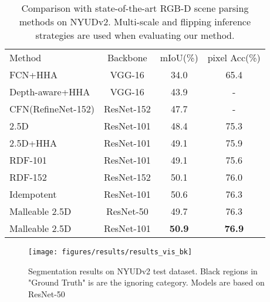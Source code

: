 \documentclass[runningheads]{llncs}
\begin{document}
\begin{table}[htbp]
  \begin{center}
  \caption{Comparison with state-of-the-art RGB-D scene parsing methods on NYUDv2.
  Multi-scale and flipping inference strategies are used when evaluating our method.
}
  \label{table:nyu_sota_compare}
  \setlength{\tabcolsep}{9pt}
  \begin{tabular}{lccc}
    \hline\noalign{\smallskip}
    Method & Backbone & mIoU(\%) & pixel Acc(\%)\\
    \noalign{\smallskip}
    \hline
    \noalign{\smallskip}
    FCN+HHA\cite{FCN_PAMI} & VGG-16  & 34.0 & 65.4 \\
Depth-aware+HHA\cite{DepthAware} & VGG-16  & 43.9 & - \\
CFN(RefineNet-152)\cite{CFN} & ResNet-152  & 47.7 & -\\
2.5D\cite{2_5D} & ResNet-101  & 48.4  & 75.3 \\
    2.5D+HHA\cite{2_5D} & ResNet-101  & 49.1  & 75.9 \\
    RDF-101\cite{RDFNet} & ResNet-101  & 49.1 & 75.6\\
    RDF-152\cite{RDFNet} & ResNet-152  & 50.1 & 76.0 \\
    Idempotent\cite{Coupling} & ResNet-101  & 50.6 & 76.3 \\
    \noalign{\smallskip}
    \hline
    \noalign{\smallskip}
    Malleable 2.5D   & ResNet-50  & 49.7 & 76.3 \\
    Malleable 2.5D  & ResNet-101  & \textbf{50.9} & \textbf{76.9} \\
    \hline
  \end{tabular}
  \end{center}
\end{table}

\begin{figure}[tbp]
  \centering
  \texttt{[image: figures/results/results\_vis\_bk]}
  \caption{
  Segmentation results on NYUDv2 test dataset.
  Black regions in "Ground Truth" is are the ignoring category.
  Models are based on ResNet-50
  }
  \label{fig:results_vis}
\end{figure}
\end{document}
